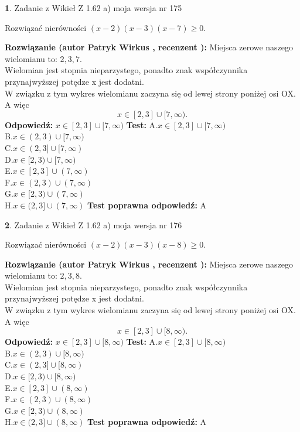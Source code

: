 \documentclass[12pt, a4paper]{article}
\theoremstyle{definition} %
\newtheorem{zad}{}
\newcommand{\zadStart}[1]{\begin{zad}#1\newline}
\newcommand{\zadStop}{\end{zad}}
\newcommand{\rozwStart}[2]{\noindent \textbf{Rozwiązanie (autor #1 , recenzent #2): }\newline}
\newcommand{\rozwStop}{\newline}
\newcommand{\odpStart}{\noindent \textbf{Odpowiedź:}\newline}
\newcommand{\odpStop}{\newline}
\newcommand{\testStart}{\noindent \textbf{Test:}\newline}
\newcommand{\testStop}{\newline}
\newcommand{\kluczStart}{\noindent \textbf{Test poprawna odpowiedź:}\newline}
\newcommand{\kluczStop}{\newline}
\begin{document}
\zadStart{Zadanie z Wikieł Z 1.62 a) moja wersja nr 175}

Rozwiązać nierówności $(x-2)(x-3)(x-7)\ge0$.
\zadStop
\rozwStart{Patryk Wirkus}{}
Miejsca zerowe naszego wielomianu to: $2, 3, 7$.\\
Wielomian jest stopnia nieparzystego, ponadto znak współczynnika przy\linebreak najwyższej potędze x jest dodatni.\\ W związku z tym wykres wielomianu zaczyna się od lewej strony poniżej osi OX. A więc $$x \in [2,3] \cup [7,\infty).$$
\rozwStop
\odpStart
$x \in [2,3] \cup [7,\infty)$
\odpStop
\testStart
A.$x \in [2,3] \cup [7,\infty)$\\
B.$x \in (2,3) \cup [7,\infty)$\\
C.$x \in (2,3] \cup [7,\infty)$\\
D.$x \in [2,3) \cup [7,\infty)$\\
E.$x \in [2,3] \cup (7,\infty)$\\
F.$x \in (2,3) \cup (7,\infty)$\\
G.$x \in [2,3) \cup (7,\infty)$\\
H.$x \in (2,3] \cup (7,\infty)$
\testStop
\kluczStart
A
\kluczStop



\zadStart{Zadanie z Wikieł Z 1.62 a) moja wersja nr 176}

Rozwiązać nierówności $(x-2)(x-3)(x-8)\ge0$.
\zadStop
\rozwStart{Patryk Wirkus}{}
Miejsca zerowe naszego wielomianu to: $2, 3, 8$.\\
Wielomian jest stopnia nieparzystego, ponadto znak współczynnika przy\linebreak najwyższej potędze x jest dodatni.\\ W związku z tym wykres wielomianu zaczyna się od lewej strony poniżej osi OX. A więc $$x \in [2,3] \cup [8,\infty).$$
\rozwStop
\odpStart
$x \in [2,3] \cup [8,\infty)$
\odpStop
\testStart
A.$x \in [2,3] \cup [8,\infty)$\\
B.$x \in (2,3) \cup [8,\infty)$\\
C.$x \in (2,3] \cup [8,\infty)$\\
D.$x \in [2,3) \cup [8,\infty)$\\
E.$x \in [2,3] \cup (8,\infty)$\\
F.$x \in (2,3) \cup (8,\infty)$\\
G.$x \in [2,3) \cup (8,\infty)$\\
H.$x \in (2,3] \cup (8,\infty)$
\testStop
\kluczStart
A
\kluczStop
\end{document}
